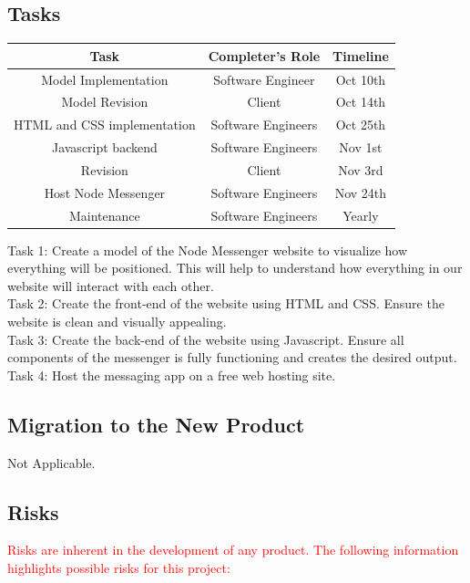 \documentclass[12pt, titlepage]{article}
\begin{document}
    	\subsection{Tasks}
    	\begin{center}
    		\begin{tabular}{|c|c|c|}
    		\hline 
    		\textbf{Task} & \textbf{Completer's Role} & \textbf{Timeline} \\ 
    		\hline 
    		Model Implementation & Software Engineer & Oct 10th \\ 
    		\hline 
    		Model Revision & Client & Oct 14th \\ 
    		\hline 
    		HTML and CSS implementation & Software Engineers & Oct 25th \\ 
    		\hline 
    		Javascript backend & Software Engineers &  Nov 1st\\ 
    		\hline 
    		Revision & Client & Nov 3rd \\ 
    		\hline 
    		Host Node Messenger& Software Engineers & Nov 24th \\ 
    		\hline 
    		Maintenance & Software Engineers & Yearly \\ 
    		\hline 
    	\end{tabular} 
    	\end{center}
		Task 1: Create a model of the Node Messenger website to visualize how everything will be positioned. This will help to understand how everything in our website will interact with each other.\\
		Task 2: Create the front-end of the website using HTML and CSS. Ensure the website is clean and visually appealing.\\
		Task 3: Create the back-end of the website using Javascript. Ensure all components of the messenger is fully functioning and creates the desired output. Task 4: Host the messaging app on a free web hosting site.

    	\subsection{Migration to the New Product}
    	Not Applicable.

    	\subsection{Risks}
    	\textcolor{red}{Risks are inherent in the development of any product. The following information highlights possible risks for this project: \\}
    	
\end{document}
